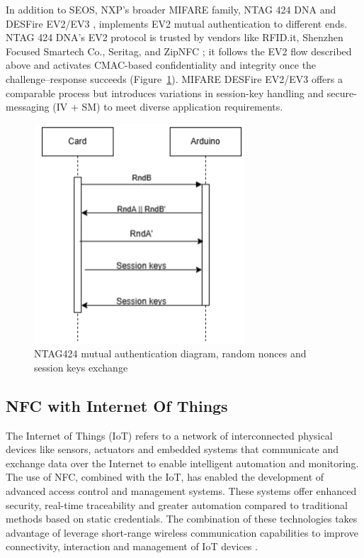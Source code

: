 In addition to SEOS, NXP’s broader MIFARE family, NTAG 424 DNA and DESFire EV2/EV3 \cite{ref32}, implements EV2 mutual authentication to different ends. NTAG 424 DNA’s EV2 protocol is trusted by vendors like RFID.it, Shenzhen Focused Smartech Co., Seritag, and ZipNFC \cite{ref84}; it follows the EV2 flow described above and activates CMAC-based confidentiality and integrity once the challenge–response succeeds (Figure~\ref{fig:ntag424_ev2}). MIFARE DESFire EV2/EV3 offers a comparable process but introduces variations in session-key handling and secure-messaging (IV + SM) to meet diverse application requirements.

\begin{figure}[h!]
	\centering
	\includegraphics[width=0.7\textwidth]{imaxes/MA_diagram.png} %
	\caption{NTAG424 mutual authentication diagram, random nonces and session keys exchange}
	\label{fig:ntag424_ev2}
\end{figure}

\subsection{NFC with Internet Of Things}

The Internet of Things (IoT) refers to a network of interconnected physical devices like sensors, actuators and embedded systems that communicate and exchange data over the Internet to enable intelligent automation and monitoring. The use of NFC, combined with the IoT, has enabled the development of advanced access control and management systems. These systems offer enhanced security, real-time traceability and greater automation compared to traditional methods based on static credentials. The combination of these technologies takes advantage of leverage short-range wireless communication capabilities to improve connectivity, interaction and management of IoT devices \cite{ref33}.

